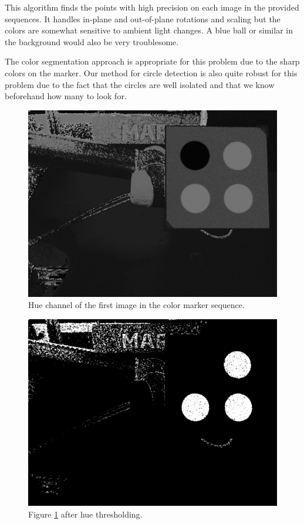 \documentclass[]{scrartcl}
\begin{document}
This algorithm finds the points with high precision on each image in the provided sequences. It handles in-plane and out-of-plane rotations and scaling but the colors are somewhat sensitive to ambient light changes. A blue ball or similar in the background would also be very troublesome.\par
The color segmentation approach is appropriate for this problem due to the sharp colors on the marker. Our method for circle detection is also quite robust for this problem due to the fact that the circles are well isolated and that we know beforehand how many to look for.

\begin{figure}
	\centering
	\includegraphics[width=0.7\linewidth]{fig/hue0-1.png}
	\caption{Hue channel of the first image in the color marker sequence.}
	\label{fig:hue1}
\end{figure}

\begin{figure}
	\centering
	\includegraphics[width=0.7\linewidth]{fig/bin0-1.png}
	\caption{Figure \ref{fig:hue1} after hue thresholding.}
	\label{fig:bin1}
\end{figure}
\end{document}
